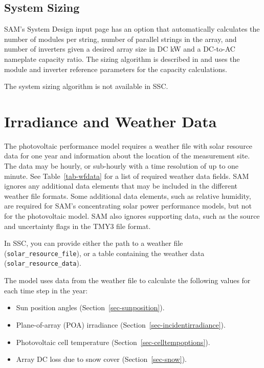 \documentclass[12pt,letterpaper]{article}
\begin{document}
\section{System Sizing} \label{sec-sizing}

SAM's System Design input page has an option that automatically calculates the number of modules per string, number of parallel strings in the array, and number of inverters given a desired array size in DC kW and a DC-to-AC nameplate capacity ratio. The sizing algorithm is described in \citet{help-sizing} and uses the module and inverter reference parameters for the capacity calculations.

The system sizing algorithm is not available in SSC.

\chapter{Irradiance and Weather Data}\label{sec-irradianceweatherdata}

The photovoltaic performance model requires a weather file with solar resource data for one year and information about the location of the measurement site. The data may be hourly, or sub-hourly with a time resolution of up to one minute. See Table~\ref{tab-wfdata} for a list of required weather data fields. SAM ignores any additional data elements that may be included in the different weather file formats. Some additional data elements, such as relative humidity, are required for SAM's concentrating solar power performance models, but not for the photovoltaic model. SAM also ignores supporting data, such as the source and uncertainty flags in the TMY3 file format.

In SSC, you can provide either the path to a weather file (\texttt{solar\_resource\_file}), or a table containing the weather data (\texttt{solar\_resource\_data}). 

The model uses data from the weather file to calculate the following values for each time step in the year:

\begin{itemize}
\item Sun position angles (Section~\ref{sec-sunposition}).
\item Plane-of-array (POA) irradiance (Section~\ref{sec-incidentirradiance}).
\item Photovoltaic cell temperature (Section~\ref{sec-celltempoptions}).
\item Array DC loss due to snow cover (Section~\ref{sec-snow}).
\end{itemize}
\end{document}

